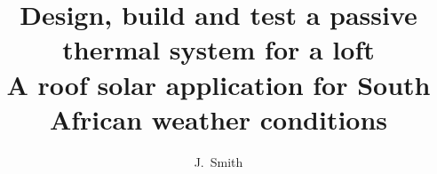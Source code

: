 \documentclass[14pt,a4paper, afrikaans,english,masters-a,goldenblock]{stb-thesis-x}
\title{\bfseries Design, build and test a passive\\ thermal system for a loft\\[2ex]
       \normalfont\large A roof solar application for South African weather conditions}
\author{J.\ Smith}{John Smith}
\begin{document}
\frontmatter
\TitlePage
\end{document}
